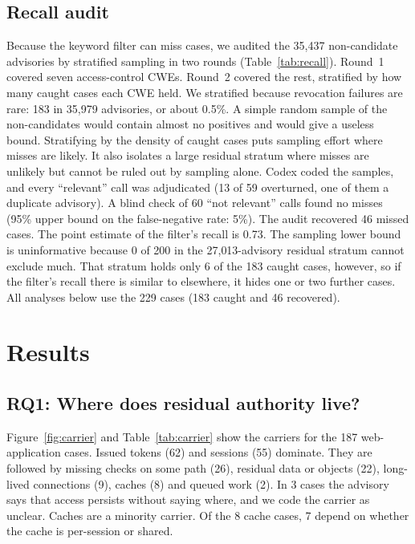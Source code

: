 \documentclass[preprint,12pt]{elsarticle}
\begin{document}
\subsection{Recall audit}\label{sec:recall}
Because the keyword filter can miss cases, we audited the 35{,}437 non-candidate advisories by
stratified sampling in two rounds (Table~\ref{tab:recall}). Round~1 covered seven access-control CWEs. Round~2 covered the
rest, stratified by how many caught cases each CWE held. We stratified because
revocation failures are rare: 183 in 35{,}979 advisories, or about 0.5\%. A simple random sample of the non-candidates
would contain almost no positives and would give a useless bound. Stratifying by the density of caught cases puts
sampling effort where misses are likely. It also isolates a large residual stratum where misses are unlikely but
cannot be ruled out by sampling alone. Codex coded the samples, and every ``relevant''
call was adjudicated (13 of 59 overturned, one of them a duplicate advisory). A blind check of 60 ``not relevant''
calls found no misses (95\% upper bound on the false-negative rate: 5\%). The audit recovered 46 missed cases.
The point estimate of the filter's recall is 0.73. The sampling lower bound is uninformative because
0 of 200 in the 27{,}013-advisory residual stratum cannot exclude much. That stratum holds only 6 of the 183 caught cases, however, so if the filter's recall there is similar to elsewhere, it hides one or two further cases.
All analyses below use the 229 cases (183 caught and 46 recovered).

\begin{table}[t]
\centering\small
\caption{Recall audit over non-candidate advisories. UB is a 95\% upper bound on missed cases (rule of three
when none were found).}
\label{tab:recall}
\resizebox{\linewidth}{!}{}
\end{table}

\section{Results}

\subsection{RQ1: Where does residual authority live?}
Figure~\ref{fig:carrier} and Table~\ref{tab:carrier} show the carriers for the 187 web-application cases.
Issued tokens (62) and sessions (55) dominate. They are followed by missing checks on some path (26), residual
data or objects (22), long-lived connections (9), caches (8) and queued work (2). In 3 cases the advisory says that
access persists without saying where, and we code the carrier as unclear. Caches are a minority carrier. Of the 8 cache
cases, 7 depend on whether the cache is per-session or shared.
\end{document}
